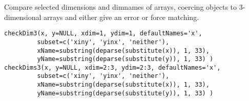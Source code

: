 \documentclass{article}
\begin{document}
\begin{Description}\relax
Compare selected dimensions and dimnames of arrays, coercing objects
to 3-dimensional arrays and either give an error or force matching.
\end{Description}
\begin{Usage}
\begin{verbatim}
checkDim3(x, y=NULL, xdim=1, ydim=1, defaultNames='x',
         subset=c('xiny', 'yinx', 'neither'),
         xName=substring(deparse(substitute(x)), 1, 33),
         yName=substring(deparse(substitute(y)), 1, 33) )
checkDims3(x, y=NULL, xdim=2:3, ydim=2:3, defaultNames='x',
         subset=c('xiny', 'yinx', 'neither'),
         xName=substring(deparse(substitute(x)), 1, 33),
         yName=substring(deparse(substitute(y)), 1, 33) )
\end{verbatim}
\end{Usage}
\end{document}
